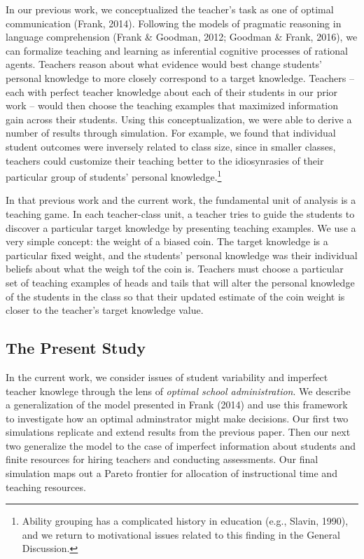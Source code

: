 \documentclass[10pt, letterpaper]{article}
\begin{document}
In our previous work, we conceptualized the teacher's task as one of
optimal communication (Frank, 2014). Following the models of pragmatic
reasoning in language comprehension (Frank \& Goodman, 2012; Goodman \&
Frank, 2016), we can formalize teaching and learning as inferential
cognitive processes of rational agents. Teachers reason about what
evidence would best change students' personal knowledge to more closely
correspond to a target knowledge. Teachers -- each with perfect teacher
knowledge about each of their students in our prior work -- would then
choose the teaching examples that maximized information gain across
their students. Using this conceptualization, we were able to derive a
number of results through simulation. For example, we found that
individual student outcomes were inversely related to class size, since
in smaller classes, teachers could customize their teaching better to
the idiosynrasies of their particular group of students' personal
knowledge.\footnote{Ability grouping has a complicated history in
  education (e.g., Slavin, 1990), and we return to motivational issues
  related to this finding in the General Discussion.}

In that previous work and the current work, the fundamental unit of
analysis is a teaching game. In each teacher-class unit, a teacher tries
to guide the students to discover a particular target knowledge by
presenting teaching examples. We use a very simple concept: the weight
of a biased coin. The target knowledge is a particular fixed weight, and
the students' personal knowledge was their individual beliefs about what
the weigh tof the coin is. Teachers must choose a particular set of
teaching examples of heads and tails that will alter the personal
knowledge of the students in the class so that their updated estimate of
the coin weight is closer to the teacher's target knowledge value.

\subsection{The Present Study}\label{the-present-study}

In the current work, we consider issues of student variability and
imperfect teacher knowlege through the lens of \emph{optimal school
administration}. We describe a generalization of the model presented in
Frank (2014) and use this framework to investigate how an optimal
adminstrator might make decisions. Our first two simulations replicate
and extend results from the previous paper. Then our next two generalize
the model to the case of imperfect information about students and finite
resources for hiring teachers and conducting assessments. Our final
simulation maps out a Pareto frontier for allocation of instructional
time and teaching resources.
\end{document}
